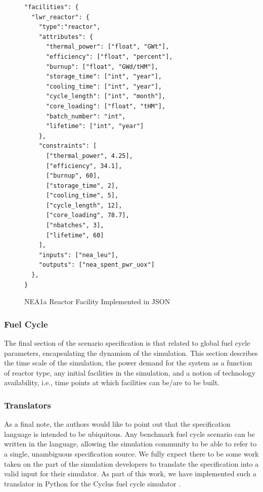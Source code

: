 \documentclass{anstrans}
\begin{document}
\begin{figure}[h!]
\begin{Verbatim}[frame=single]
"facilities": {
  "lwr_reactor": {
    "type":"reactor",
    "attributes": {
      "thermal_power": ["float", "GWt"],
      "efficiency": ["float", "percent"],
      "burnup": ["float", "GWd/tHM"],
      "storage_time": ["int", "year"],
      "cooling_time": ["int", "year"],
      "cycle_length": ["int", "month"],
      "core_loading": ["float", "tHM"],
      "batch_number": "int",
      "lifetime": ["int", "year"]
    },
    "constraints": [
      ["thermal_power", 4.25],
      ["efficiency", 34.1],
      ["burnup", 60],
      ["storage_time", 2],
      ["cooling_time", 5],
      ["cycle_length", 12],
      ["core_loading", 78.7],
      ["nbatches", 3],
      ["lifetime", 60]
    ],
    "inputs": ["nea_leu"],
    "outputs": ["nea_spent_pwr_uox"]
  },
}
\end{Verbatim}
\caption{NEA1a Reactor Facility Implemented in JSON}
\label{fig:facility}
\end{figure}

\subsubsection{Fuel Cycle}
The final section of the scenario specification is that related to global fuel
cycle parameters, encapsulating the dynamism of the simulation. This section
describes the time scale of the simulation, the power demand for the system as a
function of reactor type, any initial facilities in the simulation, and a notion
of technology availability, i.e., time points at which facilities can be/are to
be built.

\subsubsection{Translators}
As a final note, the authors would like to point out that the specification
language is intended to be ubiquitous. Any benchmark fuel cycle scenario can be
written in the language, allowing the simulation community to be able to refer
to a single, unambiguous specification source. We fully expect there to be some
work taken on the part of the simulation developers to translate the
specification into a valid input for their simulator. As part of this work, we
have implemented such a translator in Python for the Cyclus fuel cycle
simulator \cite{cyclus2012}.

\end{document}
